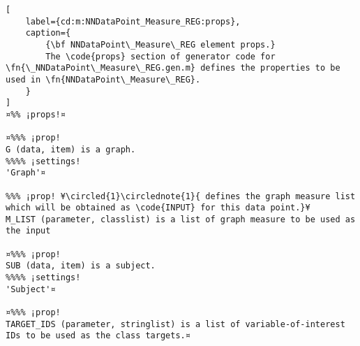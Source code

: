 \documentclass{tufte-handout}
\begin{document}
\begin{lstlisting}[
	label={cd:m:NNDataPoint_Measure_REG:props},
	caption={
		{\bf NNDataPoint\_Measure\_REG element props.}
		The \code{props} section of generator code for \fn{\_NNDataPoint\_Measure\_REG.gen.m} defines the properties to be used in \fn{NNDataPoint\_Measure\_REG}.
	}
]
¤%% ¡props!¤

¤%%% ¡prop!  
G (data, item) is a graph.
%%%% ¡settings!
'Graph'¤

%%% ¡prop! ¥\circled{1}\circlednote{1}{ defines the graph measure list which will be obtained as \code{INPUT} for this data point.}¥
M_LIST (parameter, classlist) is a list of graph measure to be used as the input

¤%%% ¡prop!
SUB (data, item) is a subject.
%%%% ¡settings!
'Subject'¤

¤%%% ¡prop!
TARGET_IDS (parameter, stringlist) is a list of variable-of-interest IDs to be used as the class targets.¤

\end{lstlisting}

\clearpage
\end{document}
